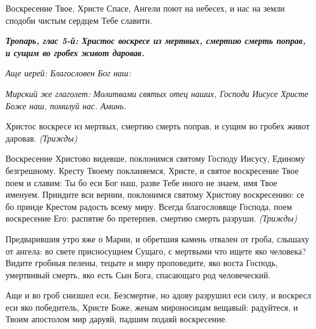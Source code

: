  



\normalfont{}Воскресение Твое, Христе Спасе, Ангели поют на небесех, и нас на земли сподоби чистым сердцем Тебе славити.

\bfseries \itshape Тропарь, глас 5-й:\normalfont{}\normalfont{}\bfseries \normalfont{}
Христос воскресе из мертвых, смертию смерть поправ, и сущим во гробех живот даровав.



\mychapterending

 


\itshape Аще иерей\normalfont{}: Благословен Бог наш:

\itshape Мирский же глаголет\normalfont{}: Молитвами святых отец наших, Господи Иисусе Христе Боже наш, помилуй нас. Аминь.



Христос воскресе из мертвых, смертию смерть поправ, и сущим во гробех живот даровав. \itshape (Трижды\normalfont{}) 



Воскресение Христово видевше, поклонимся святому Господу Иисусу, Единому безгрешному. Кресту Твоему покланяемся, Христе, и святое воскресение Твое поем и славим: Ты бо еси Бог наш, разве Тебе иного не знаем, имя Твое именуем. Приидите вси вернии, поклонимся святому Христову воскресению: се бо прииде Крестом радость всему миру. Всегда благословяще Господа, поем воскресение Его: распятие бо претерпев, смертию смерть разруши. \itshape (Трижды\normalfont{}) 


\normalfont{}Предварившия утро яже о Марии, и обретшия камень отвален от гроба, слышаху от ангела: во свете присносущнем Сущаго, с мертвыми что ищете яко человека? Видите гробныя пелены, тецыте и миру проповедите, яко воста Господь, умертвивый смерть, яко есть Сын Бога, спасающаго род человеческий. 


\normalfont{}Аще и во гроб снизшел еси, Безсмертне, но адову разрушил еси силу, и воскресл еси яко победитель, Христе Боже, женам мироносицам вещавый: радуйтеся, и Твоим апостолом мир даруяй, падшим подаяй воскресение. 

